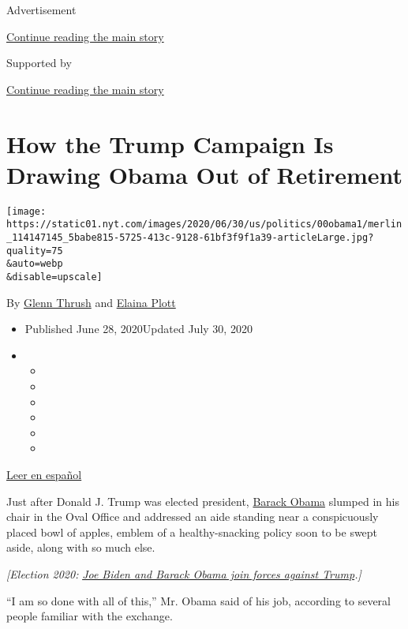 Advertisement

\protect\hyperlink{after-top}{Continue reading the main story}

Supported by

\protect\hyperlink{after-sponsor}{Continue reading the main story}

\hypertarget{how-the-trump-campaign-is-drawing-obama-out-of-retirement}{%
\section{How the Trump Campaign Is Drawing Obama Out of
Retirement}\label{how-the-trump-campaign-is-drawing-obama-out-of-retirement}}

\texttt{[image: https://static01.nyt.com/images/2020/06/30/us/politics/00obama1/merlin\_114147145\_5babe815-5725-413c-9128-61bf3f9f1a39-articleLarge.jpg?quality=75\\\&auto=webp\\\&disable=upscale]}

By \href{https://www.nytimes.com/by/glenn-thrush}{Glenn Thrush} and
\href{https://www.nytimes.com/by/elaina-plott}{Elaina Plott}

\begin{itemize}
\item
  Published June 28, 2020Updated July 30, 2020
\item
  \begin{itemize}
  \item
  \item
  \item
  \item
  \item
  \item
  \end{itemize}
\end{itemize}

\href{https://www.nytimes.com/es/2020/06/30/espanol/obama-biden-trump.html}{Leer
en español}

Just after Donald J. Trump was elected president,
\href{https://www.nytimes.com/2020/07/30/us/politics/obama-trump-biden.html}{Barack
Obama} slumped in his chair in the Oval Office and addressed an aide
standing near a conspicuously placed bowl of apples, emblem of a
healthy-snacking policy soon to be swept aside, along with so much else.

\emph{{[}Election 2020:}
\href{https://www.nytimes.com/2020/07/23/us/politics/barack-obama-joe-biden-video.html}{\emph{Joe
Biden and Barack Obama join forces against Trump}}\emph{.{]}}

``I am so done with all of this,'' Mr. Obama said of his job, according
to several people familiar with the exchange.


